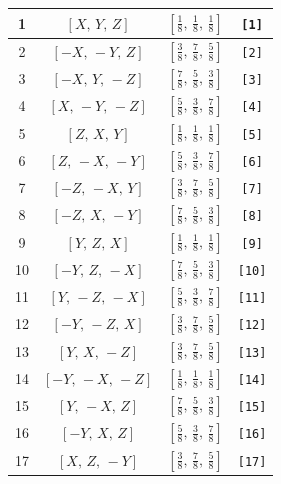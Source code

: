 \documentclass[fleqn,8pt]{jsarticle}
\begin{document}
\begin{longtable}{cccc}
1 & $\left[ X,\, Y,\, Z \right]$ & $\left[ \frac{1}{8},\, \frac{1}{8},\, \frac{1}{8} \right]$ & {\tt [1]} \\ \hline
2 & $\left[ - X,\, - Y,\, Z \right]$ & $\left[ \frac{3}{8},\, \frac{7}{8},\, \frac{5}{8} \right]$ & {\tt [2]} \\ \hline
3 & $\left[ - X,\, Y,\, - Z \right]$ & $\left[ \frac{7}{8},\, \frac{5}{8},\, \frac{3}{8} \right]$ & {\tt [3]} \\ \hline
4 & $\left[ X,\, - Y,\, - Z \right]$ & $\left[ \frac{5}{8},\, \frac{3}{8},\, \frac{7}{8} \right]$ & {\tt [4]} \\ \hline
5 & $\left[ Z,\, X,\, Y \right]$ & $\left[ \frac{1}{8},\, \frac{1}{8},\, \frac{1}{8} \right]$ & {\tt [5]} \\ \hline
6 & $\left[ Z,\, - X,\, - Y \right]$ & $\left[ \frac{5}{8},\, \frac{3}{8},\, \frac{7}{8} \right]$ & {\tt [6]} \\ \hline
7 & $\left[ - Z,\, - X,\, Y \right]$ & $\left[ \frac{3}{8},\, \frac{7}{8},\, \frac{5}{8} \right]$ & {\tt [7]} \\ \hline
8 & $\left[ - Z,\, X,\, - Y \right]$ & $\left[ \frac{7}{8},\, \frac{5}{8},\, \frac{3}{8} \right]$ & {\tt [8]} \\ \hline
9 & $\left[ Y,\, Z,\, X \right]$ & $\left[ \frac{1}{8},\, \frac{1}{8},\, \frac{1}{8} \right]$ & {\tt [9]} \\ \hline
10 & $\left[ - Y,\, Z,\, - X \right]$ & $\left[ \frac{7}{8},\, \frac{5}{8},\, \frac{3}{8} \right]$ & {\tt [10]} \\ \hline
11 & $\left[ Y,\, - Z,\, - X \right]$ & $\left[ \frac{5}{8},\, \frac{3}{8},\, \frac{7}{8} \right]$ & {\tt [11]} \\ \hline
12 & $\left[ - Y,\, - Z,\, X \right]$ & $\left[ \frac{3}{8},\, \frac{7}{8},\, \frac{5}{8} \right]$ & {\tt [12]} \\ \hline
13 & $\left[ Y,\, X,\, - Z \right]$ & $\left[ \frac{3}{8},\, \frac{7}{8},\, \frac{5}{8} \right]$ & {\tt [13]} \\ \hline
14 & $\left[ - Y,\, - X,\, - Z \right]$ & $\left[ \frac{1}{8},\, \frac{1}{8},\, \frac{1}{8} \right]$ & {\tt [14]} \\ \hline
15 & $\left[ Y,\, - X,\, Z \right]$ & $\left[ \frac{7}{8},\, \frac{5}{8},\, \frac{3}{8} \right]$ & {\tt [15]} \\ \hline
16 & $\left[ - Y,\, X,\, Z \right]$ & $\left[ \frac{5}{8},\, \frac{3}{8},\, \frac{7}{8} \right]$ & {\tt [16]} \\ \hline
17 & $\left[ X,\, Z,\, - Y \right]$ & $\left[ \frac{3}{8},\, \frac{7}{8},\, \frac{5}{8} \right]$ & {\tt [17]} \\ \hline

\end{longtable}
\end{document}
